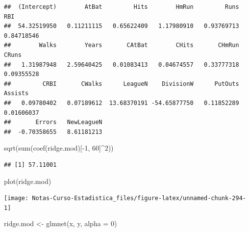 \documentclass[
  12pt,
]{book}
\newenvironment{Shaded}{\begin{snugshade}}{\end{snugshade}}
\newcommand{\AttributeTok}[1]{\textcolor[rgb]{0.77,0.63,0.00}{#1}}
\newcommand{\DecValTok}[1]{\textcolor[rgb]{0.00,0.00,0.81}{#1}}
\newcommand{\FunctionTok}[1]{\textcolor[rgb]{0.00,0.00,0.00}{#1}}
\newcommand{\NormalTok}[1]{#1}
\newcommand{\OtherTok}[1]{\textcolor[rgb]{0.56,0.35,0.01}{#1}}
\newcommand{\SpecialCharTok}[1]{\textcolor[rgb]{0.00,0.00,0.00}{#1}}
\theoremstyle{definition}
\theoremstyle{definition}
\theoremstyle{definition}
\theoremstyle{remark}
\begin{document}
\begin{verbatim}
##  (Intercept)        AtBat         Hits        HmRun         Runs          RBI 
##  54.32519950   0.11211115   0.65622409   1.17980910   0.93769713   0.84718546 
##        Walks        Years       CAtBat        CHits       CHmRun        CRuns 
##   1.31987948   2.59640425   0.01083413   0.04674557   0.33777318   0.09355528 
##         CRBI       CWalks      LeagueN    DivisionW      PutOuts      Assists 
##   0.09780402   0.07189612  13.68370191 -54.65877750   0.11852289   0.01606037 
##       Errors   NewLeagueN 
##  -0.70358655   8.61181213
\end{verbatim}

\begin{Shaded}
\begin{Highlighting}[]
\FunctionTok{sqrt}\NormalTok{(}\FunctionTok{sum}\NormalTok{(}\FunctionTok{coef}\NormalTok{(ridge.mod)[}\SpecialCharTok{{-}}\DecValTok{1}\NormalTok{, }\DecValTok{60}\NormalTok{]}\SpecialCharTok{\^{}}\DecValTok{2}\NormalTok{))}
\end{Highlighting}
\end{Shaded}

\begin{verbatim}
## [1] 57.11001
\end{verbatim}

\begin{Shaded}
\begin{Highlighting}[]
\FunctionTok{plot}\NormalTok{(ridge.mod)}
\end{Highlighting}
\end{Shaded}

\begin{center}\texttt{[image: Notas-Curso-Estadistica\_files/figure-latex/unnamed-chunk-294-1]} \end{center}

\begin{Shaded}
\begin{Highlighting}[]
\NormalTok{ridge.mod }\OtherTok{\textless{}{-}} \FunctionTok{glmnet}\NormalTok{(x, y, }\AttributeTok{alpha =} \DecValTok{0}\NormalTok{)}
\end{Highlighting}
\end{Shaded}

\begin{Shaded}
\end{Shaded}
\end{document}
